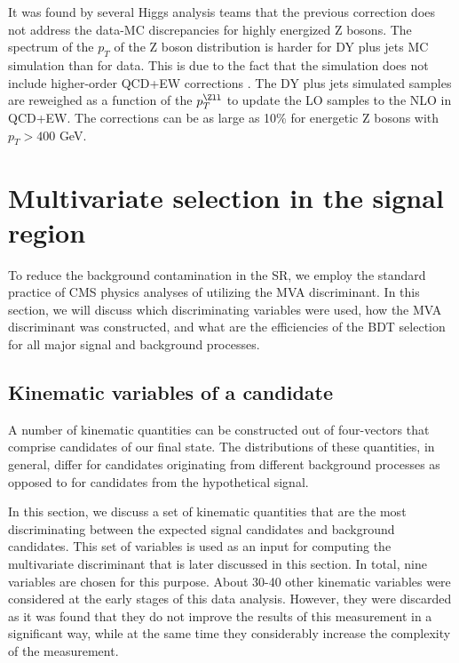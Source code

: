 \begin{itemize}
It was found by several Higgs analysis teams that the previous correction does not address the data-MC discrepancies for highly energized Z bosons. The spectrum of the $p_T$ of the Z boson distribution is harder for DY plus jets MC simulation than for data. This is due to the fact that the simulation does not include higher-order QCD+EW corrections \cite{NLO_Vjets}. The DY plus jets simulated samples are reweighed as a function of the $p_T^{\Zll}$ to update the LO samples to the NLO in QCD+EW. The corrections can be as large as 10\% for energetic Z bosons with $p_T > 400$ GeV.

\end{itemize}

\section{Multivariate selection in the signal region}

To reduce the background contamination in the SR, we employ the standard practice of CMS physics analyses of utilizing the MVA discriminant. In this section, we will discuss which discriminating variables were used, how the MVA discriminant was constructed, and what are the efficiencies of the BDT selection for all major signal and background processes. 
\label{sec:BDT}

\subsection{Kinematic variables of a candidate}
\label{variables}

A number of kinematic quantities can be constructed out of four-vectors that comprise candidates of our final state. The distributions of these quantities, in general, differ for candidates originating from different background processes as opposed to for candidates from the hypothetical signal. 

In this section, we discuss a set of kinematic quantities that are the most discriminating between the expected signal candidates and background candidates. This set of variables is used as an input for computing the multivariate discriminant that is later discussed in this section. In total, nine variables are chosen for this purpose. About 30-40 other kinematic variables were considered at the early stages of this data analysis. However, they were discarded as it was found that they do not improve the results of this measurement in a significant way, while at the same time they considerably increase the complexity of the measurement.

